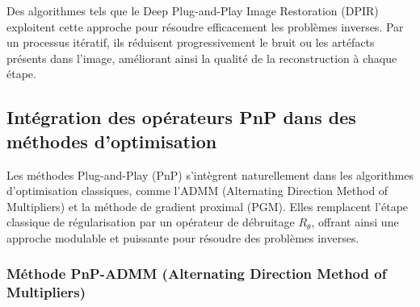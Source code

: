 \documentclass[a4paper, 12pt]{report} %
\begin{document}
Des algorithmes tels que le Deep Plug-and-Play Image Restoration (DPIR) exploitent cette approche pour résoudre efficacement les problèmes inverses. Par un processus itératif, ils réduisent progressivement le bruit ou les artéfacts présents dans l’image, améliorant ainsi la qualité de la reconstruction à chaque étape.

\subsection{Intégration des opérateurs PnP dans des méthodes d’optimisation}

Les méthodes Plug-and-Play (PnP) s’intègrent naturellement dans les algorithmes d’optimisation classiques, comme l’ADMM (Alternating Direction Method of Multipliers) et la méthode de gradient proximal (PGM). Elles remplacent l’étape classique de régularisation par un opérateur de débruitage \( R_\theta \), offrant ainsi une approche modulable et puissante pour résoudre des problèmes inverses.

\subsubsection{Méthode PnP-ADMM (Alternating Direction Method of Multipliers)}
\end{document}
